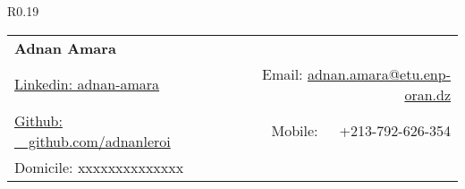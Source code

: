 \documentclass[a4paper,20pt]{article}
\begin{document}
  \begin{wrapfigure}{R}{0.19\textwidth}
         \vspace{-2cm}
 \end{wrapfigure}

\begin{tabular*}{0.80\textwidth}{l@{\extracolsep{\fill}}r}
  \textbf{{\LARGE Adnan Amara}}\\
  \href{https://www.linkedin.com/in/adnan-amara/}{Linkedin: adnan-amara}& Email: \href{mailto:}{adnan.amara@etu.enp-oran.dz}\\
  \href{https://github.com/adnanleroi}{Github: ~~github.com/adnanleroi} & Mobile:~~~+213-792-626-354 \\

  Domicile: xxxxxxxxxxxxxx

\end{tabular*}
\vspace{0.9cm}
\end{document}
